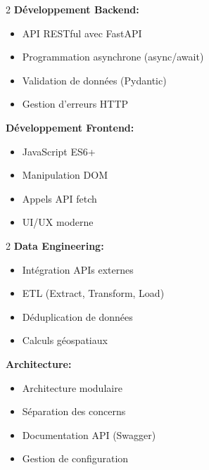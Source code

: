 \documentclass[11pt,a4paper]{article}
\begin{document}
\begin{highlightbox}
\begin{multicols}{2}
\textbf{Développement Backend:}
\begin{itemize}[leftmargin=*,nosep]
    \item API RESTful avec FastAPI
    \item Programmation asynchrone (async/await)
    \item Validation de données (Pydantic)
    \item Gestion d'erreurs HTTP
\end{itemize}

\columnbreak

\textbf{Développement Frontend:}
\begin{itemize}[leftmargin=*,nosep]
    \item JavaScript ES6+
    \item Manipulation DOM
    \item Appels API fetch
    \item UI/UX moderne
\end{itemize}
\end{multicols}

\vspace{0.5cm}

\begin{multicols}{2}
\textbf{Data Engineering:}
\begin{itemize}[leftmargin=*,nosep]
    \item Intégration APIs externes
    \item ETL (Extract, Transform, Load)
    \item Déduplication de données
    \item Calculs géospatiaux
\end{itemize}

\columnbreak

\textbf{Architecture:}
\begin{itemize}[leftmargin=*,nosep]
    \item Architecture modulaire
    \item Séparation des concerns
    \item Documentation API (Swagger)
    \item Gestion de configuration
\end{itemize}
\end{multicols}
\end{highlightbox}

\end{document}
